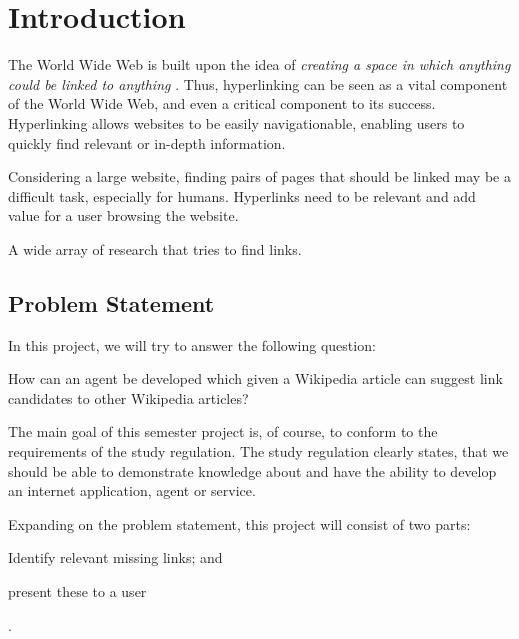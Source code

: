 \chapter{Introduction}
The World Wide Web is built upon the idea of \emph{creating a space in which anything could be linked to anything} \cite[ch.~1, p.~4]{Weaving-the-web}. Thus, hyperlinking can be seen as a vital component of the World Wide Web, and even a critical component to its success. Hyperlinking allows websites to be easily navigationable, enabling users to quickly find relevant or in-depth information.

Considering a large website, finding pairs of pages that should be linked may be a difficult task, especially for humans. Hyperlinks need to be relevant and add value for a user browsing the website.

A wide array of research that tries to find links.


\section{Problem Statement}

In this project, we will try to answer the following question:

\begin{formal}
How can an agent be developed which given a Wikipedia article can suggest link candidates to other Wikipedia articles?
\end{formal}


The main goal of this semester project is, of course, to conform to the requirements of the study regulation. The study regulation clearly states, that we should be able to demonstrate knowledge about and have the ability to develop an internet application, agent or service.

Expanding on the problem statement, this project will consist of two parts:
\begin{enumerate*}[label=(\roman*)]
  \item Identify relevant missing links; and
  \item present these to a user
\end{enumerate*}.


